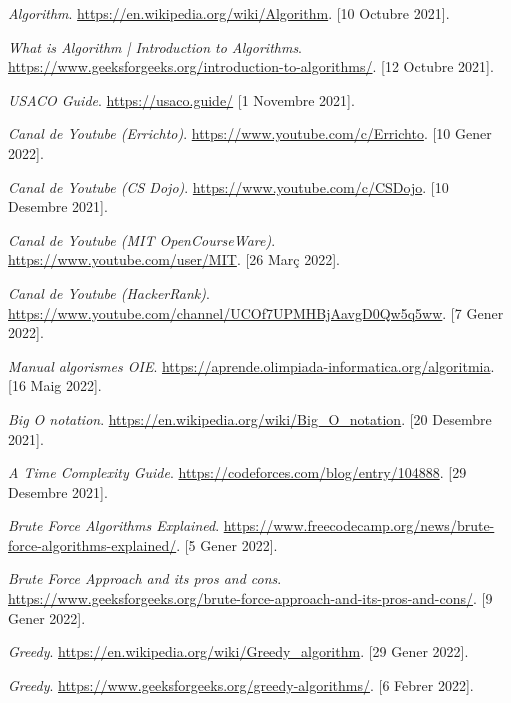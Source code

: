 \newpage




\begin{thewebography}{9}

\bibitem{}
    \emph{Algorithm}.
    \url{https://en.wikipedia.org/wiki/Algorithm}.
    [10 Octubre 2021].
   
\bibitem{}
    \emph{What is Algorithm | Introduction to Algorithms}.
    \url{https://www.geeksforgeeks.org/introduction-to-algorithms/}.
    [12 Octubre 2021].
    

\bibitem{}
    \emph{USACO Guide}.
    \url{https://usaco.guide/}
    [1 Novembre 2021].
    

\bibitem{}
    \emph{Canal de Youtube (Errichto)}.
    \url{https://www.youtube.com/c/Errichto}.
    [10 Gener 2022].

\bibitem{}
    \emph{Canal de Youtube (CS Dojo)}.
    \url{https://www.youtube.com/c/CSDojo}.
    [10 Desembre 2021].
    
\bibitem{}
    \emph{Canal de Youtube (MIT OpenCourseWare)}.
    \url{https://www.youtube.com/user/MIT}.
    [26 Març 2022].
    
\bibitem{}
    \emph{Canal de Youtube (HackerRank)}.
    \url{https://www.youtube.com/channel/UCOf7UPMHBjAavgD0Qw5q5ww}.
    [7 Gener 2022].
    
    

\bibitem{}
    \emph{Manual algorismes OIE}.
    \url{https://aprende.olimpiada-informatica.org/algoritmia}.
    [16 Maig 2022].


\bibitem{}
    \emph{Big O notation}.
    \url{https://en.wikipedia.org/wiki/Big_O_notation}.
    [20 Desembre 2021].
    
\bibitem{}
    \emph{A Time Complexity Guide}.
    \url{https://codeforces.com/blog/entry/104888}.
    [29 Desembre 2021].



\bibitem{}
    \emph{Brute Force Algorithms Explained}.
    \url{https://www.freecodecamp.org/news/brute-force-algorithms-explained/}.
    [5 Gener 2022].

\bibitem{}
    \emph{Brute Force Approach and its pros and cons}.
    \url{https://www.geeksforgeeks.org/brute-force-approach-and-its-pros-and-cons/}.
    [9 Gener 2022].



\bibitem{}
    \emph{Greedy}.
    \url{https://en.wikipedia.org/wiki/Greedy_algorithm}.
    [29 Gener 2022].

\bibitem{}
    \emph{Greedy}.
    \url{https://www.geeksforgeeks.org/greedy-algorithms/}.
    [6 Febrer 2022].




\end{thewebography}
